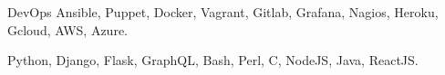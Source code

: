 

\begin{cvskills}

  \cvskill
    {DevOps} %
    {Ansible, Puppet, Docker, Vagrant, Gitlab, Grafana, Nagios, Heroku, Gcloud, AWS, Azure.} %

  \cvskill
    {
     } %
    {Python, Django, Flask, GraphQL, Bash, Perl, C, NodeJS, Java, ReactJS.} %

  \cvskill
    {} %
    {} %
\end{cvskills}
